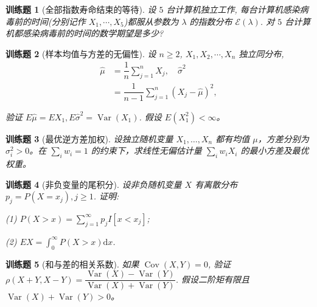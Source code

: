 \documentclass[UTF8,12pt,a4paper,fontset=fandol]{ctexbook}
\newtheorem{exercise}{训练题}[section]
\begin{document}
\begin{exercise}[全部指数寿命结束的等待]\label{q:A5.17}
设 $5$ 台计算机独立工作, 每台计算机感染病毒前的时间(分别记作 $X_1,\cdots,X_5$)都服从参数为 $\lambda$ 的指数分布 $\mathcal{E}(\lambda)$. 对 $5$ 台计算机都感染病毒前的时间的数学期望是多少?\par{}\end{exercise}

\begin{exercise}[样本均值与方差的无偏性]\label{q:A5.20}
设 $n\geq 2$, $X_1,X_2,\cdots,X_n$ 独立同分布,
    \[\begin{aligned}\hat{\mu}&=\dfrac{1}{n}\sum\limits_{j=1}^nX_j,\quad\hat{\sigma}^2\\&=\dfrac{1}{n-1}\sum\limits_{j=1}^n(X_j-\hat{\mu})^2,\end{aligned}\]

    验证 $E\hat{\mu}=EX_1,E\hat{\sigma}^2=\operatorname{Var}(X_1)$. 假设 $E(X_1^2)<\infty$。\par{}\end{exercise}

\begin{exercise}[最优逆方差加权]\label{q:A5.22}
设独立随机变量 $X_1,\ldots,X_n$ 都有均值 $\mu$，方差分别为 $\sigma_i^2>0$。在 $\sum_iw_i=1$ 的约束下，求线性无偏估计量 $\sum_iw_iX_i$ 的最小方差及最优权重。\par{}\end{exercise}

\begin{exercise}[非负变量的尾积分]\label{q:A5.25}
设非负随机变量 $X$ 有离散分布 $p_j=P(X=x_j),j\geq 1$. 证明:
    
    (1) $P(X>x)=\sum\limits_{j=1}^\infty p_jI[x<x_j]$;

    (2) $EX=\int_0^\infty P(X>x)\mathrm{d}x$.\par{}\end{exercise}

\begin{exercise}[和与差的相关系数]\label{q:A5.26}
如果 $\operatorname{Cov}(X,Y)=0$, 验证 $\rho(X+Y,X-Y)=\dfrac{\operatorname{Var}(X)-\operatorname{Var}(Y)}{\operatorname{Var}(X)+\operatorname{Var}(Y)}$. 假设二阶矩有限且 $\operatorname{Var}(X)+\operatorname{Var}(Y)>0$。\par{}\end{exercise}
\end{document}
